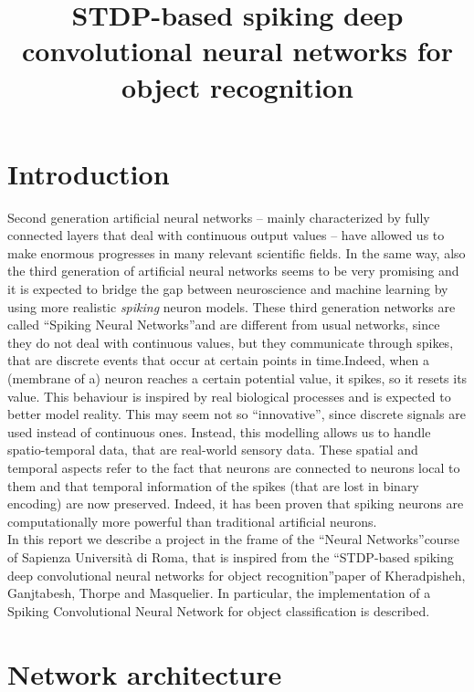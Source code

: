 \documentclass[11pt,a4paper]{scrartcl}
\date{}
\title{STDP-based spiking deep convolutional neural networks for object recognition}
\begin{document}


\tableofcontents

\clearpage
\section*{Introduction}
Second generation artificial neural networks -- mainly characterized by fully connected layers that deal with continuous output values -- have allowed us to make enormous progresses in many relevant scientific fields. In the same way, also the third generation of artificial neural networks seems to be very promising and it is expected to bridge the gap between neuroscience and machine learning by using more realistic \textit{spiking} neuron models. These third generation networks are called \textquotedblleft Spiking Neural Networks\textquotedblright and are different from usual networks, since they do not deal with continuous values, but they communicate through spikes, that are discrete events that occur at certain points in time.Indeed, when a (membrane of a) neuron reaches a certain potential value, it spikes, so it resets its value.
This behaviour is inspired by real biological processes and is expected to better model reality. This may seem not so \textquotedblleft innovative\textquotedblright, since discrete signals are used instead of continuous ones. Instead, this modelling allows us to handle spatio-temporal data, that are real-world sensory data. These spatial and temporal aspects refer to the fact that neurons are connected to neurons local to them and that temporal information of the spikes (that are lost in binary encoding) are now preserved. Indeed, it has been proven that spiking neurons are computationally more powerful than traditional artificial neurons.\\
In this report we describe a project in the frame of the \textquotedblleft Neural Networks\textquotedblright course of Sapienza Università di Roma, that is inspired from the \textquotedblleft STDP-based spiking deep convolutional neural networks for object
recognition\textquotedblright paper of Kheradpisheh, Ganjtabesh, Thorpe and Masquelier. In particular, the implementation of a Spiking Convolutional Neural Network for object classification is described.

\section{Network architecture}
\end{document}

